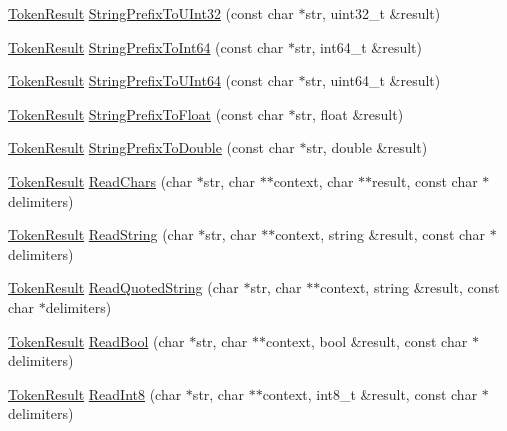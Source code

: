 \begin{DoxyCompactItemize}
\item 
\hyperlink{namespacemage_a2178ba2411db5912f41b2e7698c2037d}{Token\+Result} \hyperlink{namespacemage_a7843190a71ad080e1ae5e5f1ca518db9}{String\+Prefix\+To\+U\+Int32} (const char $\ast$str, uint32\+\_\+t \&result)
\item 
\hyperlink{namespacemage_a2178ba2411db5912f41b2e7698c2037d}{Token\+Result} \hyperlink{namespacemage_a8fda775d2c9f4f0a465d566540e91e82}{String\+Prefix\+To\+Int64} (const char $\ast$str, int64\+\_\+t \&result)
\item 
\hyperlink{namespacemage_a2178ba2411db5912f41b2e7698c2037d}{Token\+Result} \hyperlink{namespacemage_ae0ffd357b75c2e9321dcf44c00f1b607}{String\+Prefix\+To\+U\+Int64} (const char $\ast$str, uint64\+\_\+t \&result)
\item 
\hyperlink{namespacemage_a2178ba2411db5912f41b2e7698c2037d}{Token\+Result} \hyperlink{namespacemage_a760872d7402dea494afc7e402c7b38da}{String\+Prefix\+To\+Float} (const char $\ast$str, float \&result)
\item 
\hyperlink{namespacemage_a2178ba2411db5912f41b2e7698c2037d}{Token\+Result} \hyperlink{namespacemage_a289525f635f3921024dd10dd6073a555}{String\+Prefix\+To\+Double} (const char $\ast$str, double \&result)
\item 
\hyperlink{namespacemage_a2178ba2411db5912f41b2e7698c2037d}{Token\+Result} \hyperlink{namespacemage_a5f2717cd5b7cfa9a43396e628e18a5d0}{Read\+Chars} (char $\ast$str, char $\ast$$\ast$context, char $\ast$$\ast$result, const char $\ast$delimiters)
\item 
\hyperlink{namespacemage_a2178ba2411db5912f41b2e7698c2037d}{Token\+Result} \hyperlink{namespacemage_aa4f9ae6b6aa815ab879d4ea1f0453172}{Read\+String} (char $\ast$str, char $\ast$$\ast$context, string \&result, const char $\ast$delimiters)
\item 
\hyperlink{namespacemage_a2178ba2411db5912f41b2e7698c2037d}{Token\+Result} \hyperlink{namespacemage_a0d98db3ab52b137bc811727c68659329}{Read\+Quoted\+String} (char $\ast$str, char $\ast$$\ast$context, string \&result, const char $\ast$delimiters)
\item 
\hyperlink{namespacemage_a2178ba2411db5912f41b2e7698c2037d}{Token\+Result} \hyperlink{namespacemage_af0a37dab7ba4c58335ff1e84d7279c1c}{Read\+Bool} (char $\ast$str, char $\ast$$\ast$context, bool \&result, const char $\ast$delimiters)
\item 
\hyperlink{namespacemage_a2178ba2411db5912f41b2e7698c2037d}{Token\+Result} \hyperlink{namespacemage_a53968b4c1082fa6042a1278a1fb628d1}{Read\+Int8} (char $\ast$str, char $\ast$$\ast$context, int8\+\_\+t \&result, const char $\ast$delimiters)

\end{DoxyCompactItemize}
